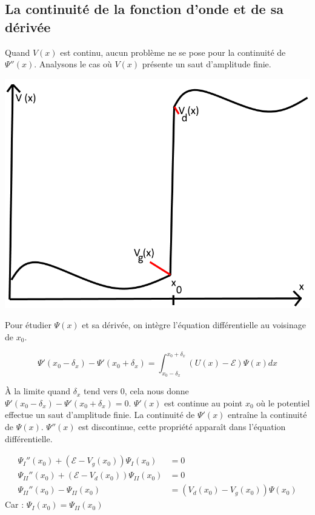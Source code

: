 \documentclass[12pt,a4paper,titlepage]{book}
\begin{document}
\subsection{La continuité de la fonction d'onde et de sa dérivée}

Quand $V(x)$ est continu, aucun problème ne se pose pour la continuité de $\Psi''(x)$. Analysons le cas où $V(x)$ présente un saut d'amplitude finie.\\

\begin{center}
\includegraphics[scale=0.4]{6_2_1-V-x.png}
\end{center}

Pour étudier $\Psi (x)$ et sa dérivée, on intègre l'équation différentielle au voisinage de $x_0$.

\begin{equation*}
\Psi' (x_0 - \delta_x) - \Psi' (x_0 + \delta_x) = \int_{x_0 - \delta_x}^{x_0 + \delta_x} \left( U (x) - \mathcal{E} \right) \Psi (x) dx
\end{equation*}

À la limite quand $\delta_x$ tend vers 0, cela nous donne $\Psi' (x_0 - \delta_x) - \Psi' (x_0 + \delta_x) = 0$. $\Psi' (x)$ est continue au point $x_0$ où le potentiel effectue un saut d'amplitude finie. La continuité de $\Psi' (x)$ entraîne la continuité de $\Psi (x)$. $\Psi'' (x)$ est discontinue, cette propriété apparaît dans l'équation différentielle.

\begin{align*}
\Psi_{I}'' (x_0) + ( \mathcal{E} - V_g (x_0) ) \Psi_{I} (x_0) &= 0\\
\Psi_{II}'' (x_0) + ( \mathcal{E} - V_d (x_0) ) \Psi_{II} (x_0) &= 0\\
\Psi_{II}'' (x_0) - \Psi_{II} (x_0) &= ( V_d (x_0) - V_g (x_0) ) \Psi (x_0)
\end{align*}
Car : $\Psi_{I} (x_0) = \Psi_{II} (x_0)$
\end{document}
